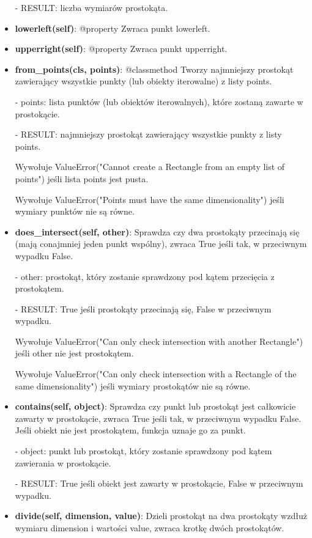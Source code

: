 \documentclass{lab}
\begin{document}
\begin{itemize}
  - RESULT: liczba wymiarów prostokąta.

  \item \textbf{lowerleft(self)}:
  @property Zwraca punkt lowerleft.

  \item \textbf{upperright(self)}:
  @property Zwraca punkt upperright.

  \item \textbf{from\_points(cls, points)}:
  @classmethod Tworzy najmniejszy prostokąt zawierający wszystkie punkty (lub obiekty iterowalne) z listy points.

  - points: lista punktów (lub obiektów iterowalnych), które zostaną zawarte w prostokącie.

  - RESULT: najmniejszy prostokąt zawierający wszystkie punkty z listy points.

  Wywołuje ValueError("Cannot create a Rectangle from an empty list of points") jeśli lista points jest pusta.

  Wywołuje ValueError("Points must have the same dimensionality") jeśli wymiary punktów nie są równe.

  \item \textbf{does\_intersect(self, other)}:
  Sprawdza czy dwa prostokąty przecinają się (mają conajmniej jeden punkt wspólny), zwraca True jeśli tak, w przeciwnym wypadku False.

  - other: prostokąt, który zostanie sprawdzony pod kątem przecięcia z prostokątem.

  - RESULT: True jeśli prostokąty przecinają się, False w przeciwnym wypadku.

  Wywołuje ValueError("Can only check intersection with another Rectangle") jeśli other nie jest prostokątem.

  Wywołuje ValueError("Can only check intersection with a Rectangle of the same dimensionality") jeśli wymiary prostokątów nie są równe.

  \item \textbf{contains(self, object)}:
  Sprawdza czy punkt lub prostokąt jest całkowicie zawarty w prostokącie, zwraca True jeśli tak, w przeciwnym wypadku False. Jeśli obiekt nie jest prostokątem, funkcja uznaje go za punkt.

  - object: punkt lub prostokąt, który zostanie sprawdzony pod kątem zawierania w prostokącie.

  - RESULT: True jeśli obiekt jest zawarty w prostokącie, False w przeciwnym wypadku.

  \item \textbf{divide(self, dimension, value)}:
  Dzieli prostokąt na dwa prostokąty wzdłuż wymiaru dimension i wartości value, zwraca krotkę dwóch prostokątów.


\end{itemize}
\end{document}
